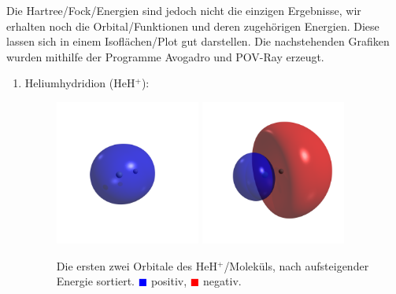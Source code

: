 Die Hartree\-/Fock\-/Energien sind jedoch nicht die einzigen Ergebnisse,
wir erhalten noch die Orbital\-/Funktionen und deren zugehörigen Energien.
Diese lassen sich in einem Isoflächen\-/Plot gut darstellen.
Die nachstehenden Grafiken wurden mithilfe der Programme Avogadro \cite{avogadro}
und POV-Ray \cite{povray} erzeugt.
\begin{enumerate}
\item Heliumhydridion (HeH$^+$):
\begin{figure}[H]
\centering
\includegraphics[trim=300 300 300 300, clip, width=0.45\textwidth]{res/HeH/heh_w0.png}
\includegraphics[trim=300 300 300 300, clip, width=0.45\textwidth]{res/HeH/heh_w1.png}
\caption{Die ersten zwei Orbitale des HeH$^+$\-/Moleküls,
nach aufsteigender Energie sortiert.
\textcolor{blue}{$\blacksquare$} positiv,
\textcolor{red}{$\blacksquare$} negativ.}\label{heh_orbitals}
\end{figure}


\end{enumerate}

